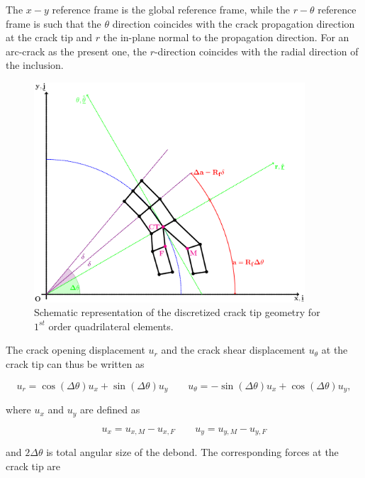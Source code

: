 The $x-y$ reference frame is the global reference frame, while the $r-\theta$ reference frame is such that the $\theta$ direction coincides with the crack propagation direction at the crack tip and $r$ the in-plane normal to the propagation direction. For an arc-crack as the present one, the $r$-direction coincides with the radial direction of the inclusion.

\begin{figure}[!h]
\includegraphics[width=0.9\textwidth]{paperA/VCCT-linear-appendix.pdf}
\caption{Schematic representation of the discretized crack tip geometry for  $1^{st}$ order quadrilateral elements.}\label{paperA:fig:vcctlinearapp}
\end{figure}

The crack opening displacement $u_{r}$ and the crack shear displacement $u_{\theta}$ at the crack tip can thus be written as

\begin{equation}
u_{r}=\cos\left(\Delta\theta\right) u_{x}+\sin\left(\Delta\theta\right) u_{y}\qquad u_{\theta}=-\sin\left(\Delta\theta\right) u_{x}+\cos\left(\Delta\theta\right) u_{y},
\end{equation}

where $u_{x}$ and $u_{y}$ are defined as

\begin{equation}\label{paperA:eq:uxuy}
u_{x}=u_{x,M}-u_{x,F}\qquad u_{y}=u_{y,M}-u_{y,F}
\end{equation}

and $2\Delta\theta$ is total angular size of the debond. The corresponding forces at the crack tip are

